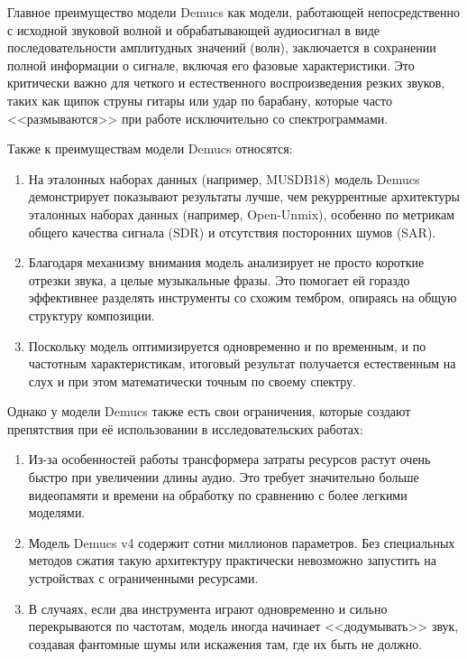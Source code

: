 \documentclass[14pt]{extarticle}
\begin{document}
Главное преимущество модели Demucs как модели, работающей непосредственно с исходной звуковой волной и обрабатывающей аудиосигнал
в виде последовательности амплитудных значений (волн), заключается в сохранении полной информации о сигнале, включая его фазовые характеристики. 
Это критически важно для четкого и естественного воспроизведения резких звуков, таких как щипок струны гитары или удар по барабану, 
которые часто <<размываются>> при работе исключительно со спектрограммами.

Также к преимуществам модели Demucs относятся:
\begin{enumerate}[label=\arabic*)]
	\item На эталонных наборах данных (например, MUSDB18) модель Demucs демонстрирует показывают результаты 
	лучше, чем рекуррентные архитектуры эталонных наборах данных (например, Open-Unmix), особенно по метрикам общего 
	качества сигнала (SDR) и отсутствия посторонних шумов (SAR).
	\item Благодаря механизму внимания модель анализирует не просто короткие отрезки звука, а целые музыкальные фразы. 
	Это помогает ей гораздо эффективнее разделять инструменты со схожим тембром, опираясь на общую структуру композиции.
	\item Поскольку модель оптимизируется одновременно и по временным, и по частотным характеристикам, итоговый результат 
	получается естественным на слух и при этом математически точным по своему спектру.
\end{enumerate}

Однако у модели Demucs также есть свои ограничения, которые создают препятствия при её использовании 
в исследовательских работах:
\begin{enumerate}[label=\arabic*)]
	\item Из-за особенностей работы трансформера затраты ресурсов растут очень быстро при увеличении длины аудио. 
	Это требует значительно больше видеопамяти и времени на обработку по сравнению с более легкими моделями.
    \item Модель Demucs v4 содержит сотни миллионов параметров. Без специальных методов сжатия такую архитектуру 
	практически невозможно запустить на устройствах с ограниченными ресурсами.
	\item В случаях, если два инструмента играют одновременно и сильно перекрываются по частотам, модель иногда 
	начинает <<додумывать>> звук, создавая фантомные шумы или искажения там, где их быть не должно.
\end{enumerate}
\end{document}
